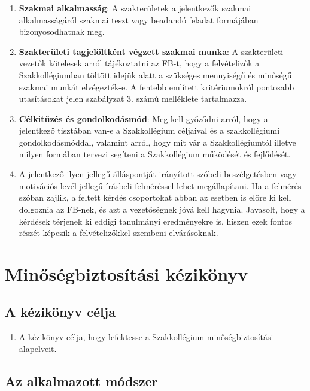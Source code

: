 \documentclass[12pt]{report}
\begin{document}
\begin{enumerate}
  \item \textbf{Szakmai alkalmasság}: A szakterületek a jelentkezők szakmai alkalmasságáról szakmai teszt vagy beadandó feladat formájában bizonyosodhatnak meg.
  \item \textbf{Szakterületi tagjelöltként végzett szakmai munka}: A szakterületi vezetők kötelesek arról tájékoztatni az FB-t, hogy a felvételizők a Szakkollégiumban 
    töltött idejük alatt a szükséges mennyiségű és minőségű szakmai munkát elvégezték-e. A fentebb említett kritériumokról pontosabb utasításokat jelen szabályzat 3. számú melléklete tartalmazza.
  \item \textbf{Célkitűzés és gondolkodásmód}: Meg kell győződni arról, hogy a jelentkező tisztában van-e a Szakkollégium céljaival és a szakkollégiumi gondolkodásmóddal, 
    valamint arról, hogy mit vár a Szakkollégiumtól illetve milyen formában tervezi segíteni a Szakkollégium működését és fejlődését.
  \item A jelentkező ilyen jellegű álláspontját irányított szóbeli beszélgetésben vagy motivációs levél jellegű írásbeli felméréssel lehet megállapítani. 
    Ha a felmérés szóban zajlik, a feltett kérdés csoportokat abban az esetben is előre ki kell dolgoznia az FB-nek, és azt a vezetőségnek jóvá kell hagynia. 
    Javasolt, hogy a kérdések térjenek ki eddigi tanulmányi eredményekre is, hiszen ezek fontos részét képezik a felvételizőkkel szembeni elvárásoknak.
\end{enumerate}


\chapter{Minőségbiztosítási kézikönyv} \label{annex_quality}

\section{A kézikönyv célja}

\begin{enumerate}
  \item A kézikönyv célja, hogy lefektesse a Szakkollégium minőségbiztosítási alapelveit.
\end{enumerate}

\section{Az alkalmazott módszer}
\end{document}
